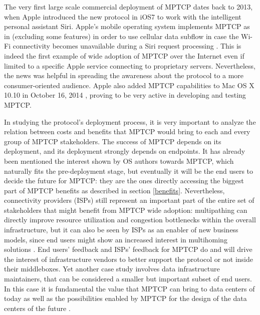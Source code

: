 The very first large scale commercial deployment of MPTCP dates back to 2013, when Apple introduced the new protocol in iOS7 to work with the intelligent personal assistant Siri. Apple's mobile operating system implements MPTCP as in  (excluding some features) in order to use cellular data subflow in case the Wi-Fi connectivity becomes unavailable during a Siri request processing \cite{apple}. This is indeed the first example of wide adoption of MPTCP over the Internet even if limited to a specific Apple service connecting to proprietary servers. Nevertheless, the news was helpful in spreading the awareness about the protocol to a more consumer-oriented audience. Apple also added MPTCP capabilities to Mac OS X 10.10 in October 16, 2014 \cite{osx}, proving to be very active in developing and testing MPTCP.

In studying the protocol's deployment process, it is very important to analyze the relation between costs and benefits that MPTCP would bring to each and every group of MPTCP stakeholders.
The success of MPTCP depends on its deployment, and its deployment strongly depends on endpoints. It has already been mentioned the interest shown by OS authors towards MPTCP, which naturally fits the pre-deployment stage, but eventually it will be the end users to decide the future for MPTCP: they are the ones directly accessing the biggest part of MPTCP benefits as described in section \ref{benefits}. Nevertheless, connectivity providers (ISPs) still represent an important part of the entire set of stakeholders that might benefit from MPTCP wide adoption: multipathing can directly improve resource utilization and congestion bottlenecks within the overall infrastructure, but it can also be seen by ISPs as an enabler of new business models, since end users might show an increased interest in multihoming solutions \cite{DBLP:conf/fia/2010}. End users' feedback and ISPs' feedback for MPTCP do and will drive the interest of infrastructure vendors to better support the protocol or not inside their middleboxes. 
Yet another case study involves data infrastructure maintainers, that can be considered a smaller but important subset of end users. In this case it is fundamental the value that MPTCP can bring to data centers of today as well as the possibilities enabled by MPTCP for the design of the data centers of the future \cite{Raiciu:2011:IDP:2043164.2018467}.

